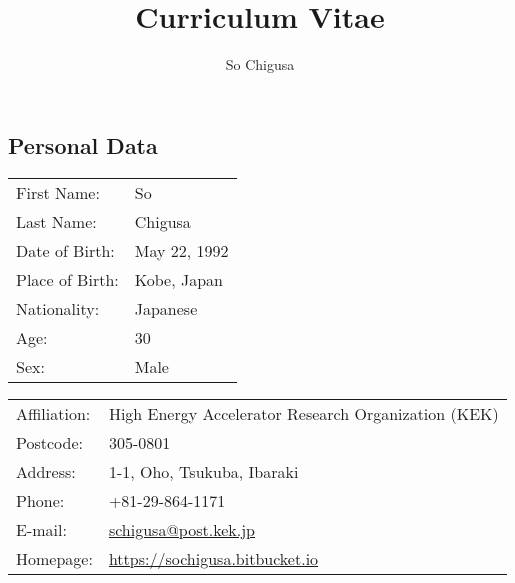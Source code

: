 \documentclass[12pt]{article}
\title{\vspace{-2cm}\textbf{Curriculum Vitae}}
\author{So Chigusa}
\begin{document}
\large
\maketitle

\newcommand{\lsim}{\stackrel{<}{_\sim}}
\newcommand{\gsim}{\stackrel{>}{_\sim}}

\newcommand{\rem}[1]{{$\spadesuit$\bf #1$\spadesuit$}}


\renewcommand{\thefootnote}{\arabic{footnote})}
\setcounter{footnote}{0}

\vspace{-5mm}
\subsection*{Personal Data}

\vspace{-3mm}

\begin{table}[h]
 \begin{tabular}{ll}
  First Name: & So %
      \\
  Last Name: & Chigusa %
      \\
  Date of Birth: & May 22, 1992 \\
  Place of Birth: & Kobe, Japan \\
  Nationality: & Japanese \\
  Age: & 30 \\
  Sex: & Male \\
 \end{tabular}
\end{table}

\vspace{-5mm}
\begin{table}[h]
 \begin{tabular}{ll}
  Affiliation: & High Energy Accelerator Research Organization (KEK) \\
  Postcode: & 305-0801 \\
  Address: & 1-1, Oho, Tsukuba, Ibaraki \\
  Phone: & +81-29-864-1171 \\
  E-mail: &
      \href{mailto:schigusa@post.kek.jp}{schigusa@post.kek.jp}
      \\
  Homepage: & \url{https://sochigusa.bitbucket.io} \\
 \end{tabular}
\end{table}
\vspace{-5mm}
\end{document}
